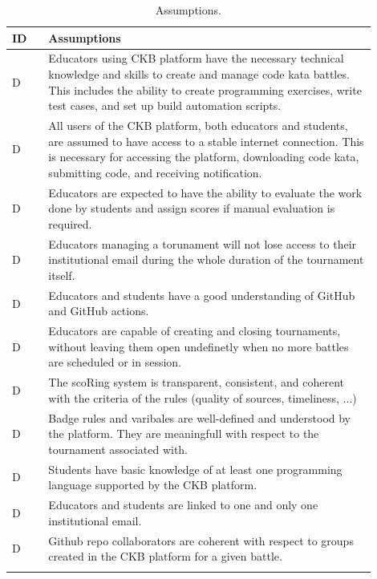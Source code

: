 \setcounter{ac}{0}
\newcommand{\ca}{\stepcounter{ac}\theac}

\newcommand{\myrow}[1]{
    A\ca & #1 \\
    \hline
}

\begin{center}
    \begin{longtable}{ |l|p{0.9\linewidth}| }
        \hline
        \textbf{ID} & \textbf{Assumptions}                                                                   \\
        \hline
        D\ca        & Educators using CKB platform have the necessary technical knowledge and skills to create and manage code kata battles. 
        This includes the ability to create programming exercises, write test cases, and set up build automation scripts.                                   \\
        \hline
        D\ca        & All users of the CKB platform, both educators and students, are assumed to have access to a stable internet connection. This is
         necessary for accessing the platform, downloading code kata, submitting code, and receiving notification.                                  \\
        \hline
        D\ca        & Educators are expected to have the ability to evaluate the work done by students and assign scores if manual evaluation is required. \\
        \hline
        D\ca        & Educators managing a torunament will not lose access to their institutional email during the whole duration of the tournament itself.        \\
        \hline
        D\ca        & Educators and students have a good understanding of GitHub and GitHub actions.                                  \\
        \hline
        D\ca        & Educators are capable of creating and closing tournaments, without leaving them open undefinetly when no more battles are scheduled or in session.                      \\
        \hline
        D\ca        & The scoRing system is transparent, consistent, and coherent with the criteria of the rules (quality of sources, timeliness, ...) \\
        \hline
        D\ca        & Badge rules and varibales are well-defined and understood by the platform. They are meaningfull with respect to the tournament associated with. \\
        \hline
        D\ca        & Students have basic knowledge of at least one programming language supported by the CKB platform. \\
        \hline  
        D\ca        & Educators and students are linked to one and only one institutional email.                                  \\
        \hline
        D\ca        & Github repo collaborators are coherent with respect to groups created in the CKB platform for a given battle. \\
        \hline
        \caption{Assumptions.}
        \label{tab:assumption_tab}%
    \end{longtable}
\end{center}

